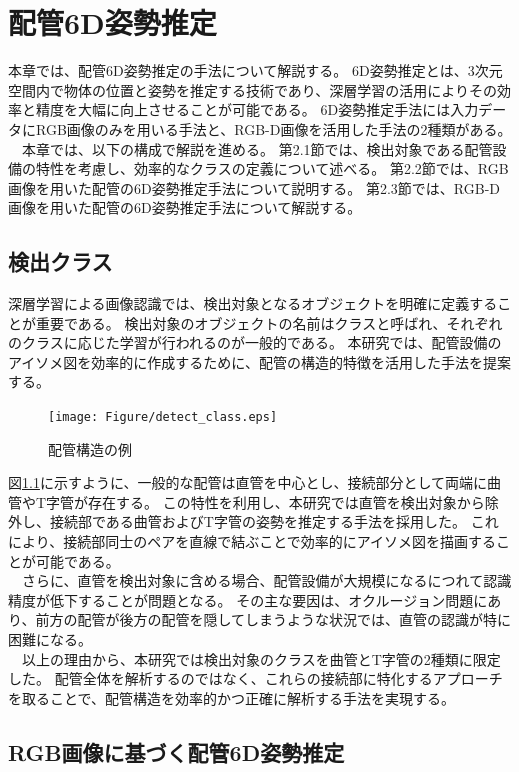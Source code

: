 \chapter{配管6D姿勢推定}
本章では、配管6D姿勢推定の手法について解説する。
6D姿勢推定とは、3次元空間内で物体の位置と姿勢を推定する技術であり、深層学習の活用によりその効率と精度を大幅に向上させることが可能である。
6D姿勢推定手法には入力データにRGB画像のみを用いる手法と、RGB-D画像を活用した手法の2種類がある。\\
　本章では、以下の構成で解説を進める。
第2.1節では、検出対象である配管設備の特性を考慮し、効率的なクラスの定義について述べる。
第2.2節では、RGB画像を用いた配管の6D姿勢推定手法について説明する。
第2.3節では、RGB-D画像を用いた配管の6D姿勢推定手法について解説する。

\section{検出クラス}
深層学習による画像認識では、検出対象となるオブジェクトを明確に定義することが重要である。
検出対象のオブジェクトの名前はクラスと呼ばれ、それぞれのクラスに応じた学習が行われるのが一般的である。
本研究では、配管設備のアイソメ図を効率的に作成するために、配管の構造的特徴を活用した手法を提案する。

\begin{figure}[htbt]
	\centering
	 \texttt{[image: Figure/detect\_class.eps]}
	 \caption{配管構造の例}
	 \label{fig:f1}
\end{figure}

図\ref{fig:f1}に示すように、一般的な配管は直管を中心とし、接続部分として両端に曲管やT字管が存在する。
この特性を利用し、本研究では直管を検出対象から除外し、接続部である曲管およびT字管の姿勢を推定する手法を採用した。
これにより、接続部同士のペアを直線で結ぶことで効率的にアイソメ図を描画することが可能である。\\
　さらに、直管を検出対象に含める場合、配管設備が大規模になるにつれて認識精度が低下することが問題となる。
その主な要因は、オクルージョン問題にあり、前方の配管が後方の配管を隠してしまうような状況では、直管の認識が特に困難になる。\\
　以上の理由から、本研究では検出対象のクラスを曲管とT字管の2種類に限定した。
配管全体を解析するのではなく、これらの接続部に特化するアプローチを取ることで、配管構造を効率的かつ正確に解析する手法を実現する。

\section{RGB画像に基づく配管6D姿勢推定}
